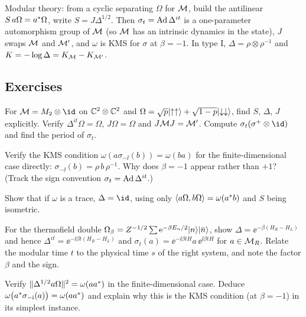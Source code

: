 \begin{keyidea}
Modular theory: from a cyclic separating $\Omega$ for $\mathcal{M}$, build the antilinear $S\,a\Omega=a^{*}\Omega$, write $S=J\Delta^{1/2}$. Then $\sigma_t=\operatorname{Ad}\Delta^{it}$ is a one-parameter automorphism group of $\mathcal{M}$ (so $\mathcal{M}$ has an intrinsic dynamics in the state), $J$ swaps $\mathcal{M}$ and $\mathcal{M}'$, and $\omega$ is KMS for $\sigma$ at $\beta=-1$. In type I, $\Delta=\rho\otimes\rho^{-1}$ and $K=-\log\Delta=K_{\mathcal{M}}-K_{\mathcal{M}'}$.
\end{keyidea}

\subsection*{Exercises}
\begin{exercise}\label{ex:tomita:1}
For $\M=M_2\otimes\id$ on $\mathbb{C}^2\otimes\mathbb{C}^2$ and $\Omega=\sqrt p\lvert \uparrow\uparrow\rangle+\sqrt{1-p}\lvert \downarrow\downarrow\rangle$, find $S$, $\Delta$, $J$ explicitly. Verify $\Delta^{it}\Omega=\Omega$, $J\Omega=\Omega$ and $J\mathcal{M} J=\mathcal{M}'$. Compute $\sigma_t(\sigma^+\otimes\id)$ and find the period of $\sigma_t$.
\end{exercise}
\begin{exercise}\label{ex:tomita:2}
Verify the KMS condition $\omega(a\sigma_{-\ii}(b))=\omega(ba)$ for the finite-dimensional case directly: $\sigma_{-\ii}(b)=\rho\,b\,\rho^{-1}$. Why does $\beta=-1$ appear rather than $+1$? (Track the sign convention $\sigma_t=\operatorname{Ad}\Delta^{it}$.)
\end{exercise}
\begin{exercise}\label{ex:tomita:3}
Show that if $\omega$ is a trace, $\Delta=\id$, using only $\langle a\Omega,b\Omega\rangle=\omega(a^{*} b)$ and $S$ being isometric.
\end{exercise}
\begin{exercise}\label{ex:tomita:4}
For the thermofield double $\Omega_\beta=Z^{-1/2}\sum\mathrm{e}^{-\beta E_n/2}\lvert n\rangle\lvert \bar n\rangle$, show $\Delta=\ee^{-\beta(H_R-H_L)}$ and hence $\Delta^{it}=\ee^{-\ii\beta t(H_R-H_L)}$ and $\sigma_t(a)=\ee^{-\ii\beta tH}a\,\ee^{\ii\beta tH}$ for $a\in\mathcal{M}_R$. Relate the modular time $t$ to the physical time $s$ of the right system, and note the factor $\beta$ and the sign.
\end{exercise}
\begin{exercise}\label{ex:tomita:5}
Verify $\lVert \Delta^{1/2}a\Omega\rVert^2=\omega(aa^{*})$ in the finite-dimensional case. Deduce $\omega\big(a^{*}\sigma_{-\mathrm{i}}(a)\big)=\omega(aa^{*})$ and explain why this is the KMS condition (at $\beta=-1$) in its simplest instance.
\end{exercise}


